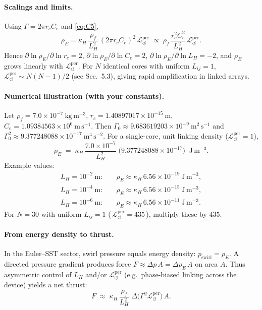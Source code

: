 \documentclass[11pt]{article}
\begin{document}
\paragraph{Scalings and limits.}
    Using $\Gamma = 2\pi r_c C_e$ and \eqref{eq:C5},
    \[
        \rho_{\!E}
        = \kappa_H\,\frac{\rho_{\!f}}{L_H^2}\,(2\pi r_c C_e)^2\,\mathcal{L}_{\circlearrowleft}^{\mathrm{per}}
        \;\propto\;
        \rho_{\!f}\,\frac{r_c^2 C_e^2}{L_H^2}\,\mathcal{L}_{\circlearrowleft}^{\mathrm{per}}.
    \]
    Hence
    $\partial\ln\rho_{\!E}/\partial\ln r_c = 2$,
    $\partial\ln\rho_{\!E}/\partial\ln C_e = 2$,
    $\partial\ln\rho_{\!E}/\partial\ln L_H = -2$,
    and $\rho_{\!E}$ grows linearly with $\mathcal{L}_{\circlearrowleft}^{\mathrm{per}}$.
    For $N$ identical cores with uniform $L_{ij}=1$,
    $\mathcal{L}_{\circlearrowleft}^{\mathrm{per}}\!\sim N(N\!-\!1)/2$
    (see Sec.~5.3), giving rapid amplification in linked arrays.

\paragraph{Numerical illustration (with your constants).}
    Let $\rho_{\!f}=7.0\times10^{-7}\ \mathrm{kg\,m^{-3}}$,
    $r_c=1.40897017\times10^{-15}\ \mathrm{m}$,
    $C_e=1.09384563\times10^{6}\ \mathrm{m\,s^{-1}}$.
    Then $\Gamma_0\approx 9.683619203\times10^{-9}\ \mathrm{m^2\,s^{-1}}$
    and $\Gamma_0^2\approx 9.377248088\times10^{-17}\ \mathrm{m^4\,s^{-2}}$.
    For a single-core, unit linking density ($\mathcal{L}_{\circlearrowleft}^{\mathrm{per}}=1$),
    \[
        \rho_{\!E}
        \;=\;
        \kappa_H\,\frac{7.0\times10^{-7}}{L_H^2}\;
        \bigl(9.377248088\times10^{-17}\bigr)
        \;\; \mathrm{J\,m^{-3}}.
    \]
    Example values:
    \begin{align*}
    L_H=10^{-2}\ \mathrm{m}:&\quad \rho_{\!E}\approx
    \kappa_H\,6.56\times10^{-19}\ \mathrm{J\,m^{-3}},\\
    L_H=10^{-4}\ \mathrm{m}:&\quad \rho_{\!E}\approx
    \kappa_H\,6.56\times10^{-15}\ \mathrm{J\,m^{-3}},\\
    L_H=10^{-6}\ \mathrm{m}:&\quad \rho_{\!E}\approx
    \kappa_H\,6.56\times10^{-11}\ \mathrm{J\,m^{-3}}.
    \end{align*}
    For $N=30$ with uniform $L_{ij}=1$ (\,$\mathcal{L}_{\circlearrowleft}^{\mathrm{per}}=435$\,),
    multiply these by $435$.

\paragraph{From energy density to thrust.}
    In the Euler–SST sector, swirl pressure equals energy density:
    $p_{\text{swirl}}=\rho_{\!E}$. A directed pressure gradient produces force
    $F \approx \Delta p \, A = \Delta \rho_{\!E}\,A$ on area $A$.
    Thus asymmetric control of $L_H$ and/or $\mathcal{L}_{\circlearrowleft}^{\mathrm{per}}$
    (e.g.\ phase-biased linking across the device) yields a net thrust:
    \[
        F \;\approx\; \kappa_H\,\frac{\rho_{\!f}}{L_H^{2}}\;\Delta\!\big(\Gamma^{2}\mathcal{L}_{\circlearrowleft}^{\mathrm{per}}\big)\,A.
    \]
\end{document}
